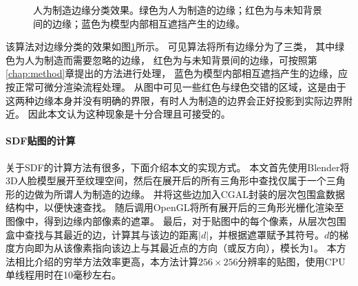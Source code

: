 \begin{figure}
\centering
{}
\caption[人为制造边缘分类效果]{人为制造边缘分类效果。绿色为人为制造的边缘；红色为与未知背景间的边缘；蓝色为模型内部相互遮挡产生的边缘。}
\label{fig:sdf_result}
\end{figure}

该算法对边缘分类的效果如图\ref{fig:sdf_result}所示。
可见算法将所有边缘分为了三类，
其中绿色为人为制造而需要忽略的边缘，
红色为与未知背景间的边缘，可按照第\ref{chap:method}章提出的方法进行处理，
蓝色为模型内部相互遮挡产生的边缘，应按正常可微分渲染流程处理。
从图中可见一些红色与绿色交错的区域，这是由于这两种边缘本身并没有明确的界限，有时人为制造的边界会正好投影到实际边界附近。
因此本文认为这种现象是十分合理且可接受的。

\paragraph{SDF贴图的计算}
关于SDF的计算方法有很多，下面介绍本文的实现方式。
本文首先使用Blender将3D人脸模型展开至纹理空间，然后在展开后的所有三角形中查找仅属于一个三角形的边做为所谓人为制造的边缘。
并将这些边加入CGAL封装的层次包围盒\citep{cgal_aabb}数据结构中，以便快速查找。
随后调用OpenGL将所有展开后的三角形光栅化渲染至图像中，得到边缘内部像素的遮罩。
最后，对于贴图中的每个像素，从层次包围盒中查找与其最近的边，计算其与该边的距离$|d|$，并根据遮罩赋予其符号。$d$的梯度方向即为从该像素指向该边上与其最近点的方向（或反方向），模长为$1$。
本方法相比\citet{green2007improved}介绍的穷举方法效率更高，本方法计算$256\times256$分辨率的贴图，使用CPU单线程用时在10毫秒左右。

